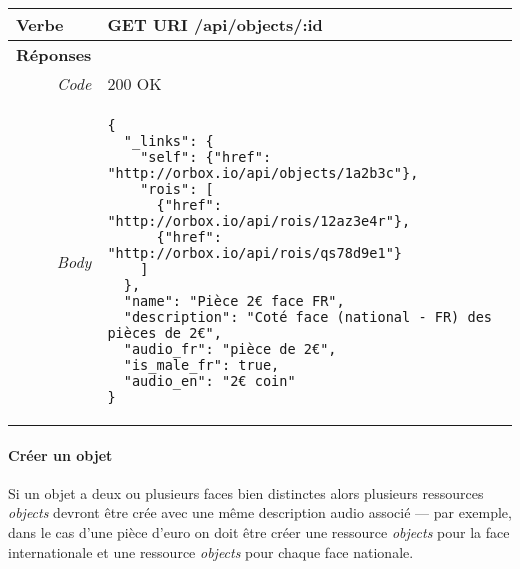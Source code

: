 \begin{appendices}
\begin{absolutelynopagebreak}
\begin{tabular}{@{}p{2cm}p{11.5cm}@{}}
    \toprule
    \textbf{Verbe}                        & GET \hspace{2.5cm} \textbf{URI} \hspace{0.25cm} /api/objects/:id   \\ \midrule
    \midrule
    \textbf{Réponses}                     &        \\
    \multicolumn{1}{r}{\textit{Code}}   & 200 OK \\
    \multicolumn{1}{r}{\textit{Body}}   & \begin{verbatim}
{
  "_links": {
    "self": {"href": "http://orbox.io/api/objects/1a2b3c"},
    "rois": [
      {"href": "http://orbox.io/api/rois/12az3e4r"},
      {"href": "http://orbox.io/api/rois/qs78d9e1"}
    ]
  },
  "name": "Pièce 2€ face FR",
  "description": "Coté face (national - FR) des pièces de 2€",
  "audio_fr": "pièce de 2€",
  "is_male_fr": true,
  "audio_en": "2€ coin"
}
    \end{verbatim}
    \label{jsonHalObjects}
    \\ \bottomrule
\end{tabular}
\end{absolutelynopagebreak}

\begin{absolutelynopagebreak}
\paragraph{Créer un objet}

Si un objet a deux ou plusieurs faces bien distinctes alors plusieurs ressources \emph{objects}  devront être crée avec une même description audio associé --- par exemple, dans le cas d'une pièce d'euro on doit être créer une ressource \emph{objects} pour la face internationale et une ressource \emph{objects} pour chaque face nationale.


\end{absolutelynopagebreak}
\end{appendices}
